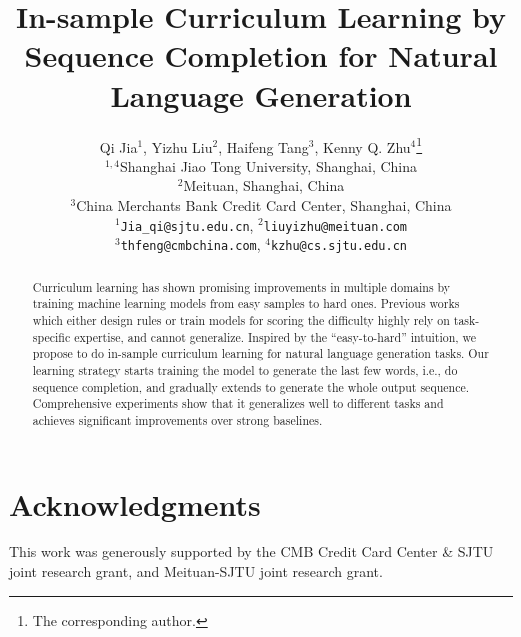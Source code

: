 \documentclass[11pt]{article}
\title{In-sample Curriculum Learning by Sequence Completion for Natural Language Generation}
\author{Qi Jia$^1$, Yizhu Liu$^2$, Haifeng Tang$^3$, Kenny Q. Zhu$^4$\thanks{\hspace{2mm}The corresponding author.}\\
	$^{1,4}$Shanghai Jiao Tong University, Shanghai, China \\
	$^2$Meituan, Shanghai, China \\
	$^3$China Merchants Bank Credit Card Center, Shanghai, China \\
	\texttt{$^1$Jia\_qi@sjtu.edu.cn},
	\texttt{$^2$liuyizhu@meituan.com} \\ 
	\texttt{$^3$thfeng@cmbchina.com},
	\texttt{$^4$kzhu@cs.sjtu.edu.cn}\\
}
\begin{document}
\maketitle
\begin{abstract}
Curriculum learning has shown promising improvements in multiple domains by 
training machine learning models from easy samples to hard ones. 
Previous works which either design rules or train models for scoring the difficulty 
highly rely on task-specific expertise, and cannot generalize. Inspired by the ``easy-to-hard'' 
intuition, we propose to do in-sample curriculum learning for natural language generation tasks. 
Our learning strategy starts training the model to generate the last few words, i.e., 
do sequence completion, and gradually extends to generate the whole output sequence.
Comprehensive experiments show that it generalizes well to different
tasks and achieves significant improvements over strong baselines.
\end{abstract}








\section*{Acknowledgments}
This work was generously supported by the CMB Credit Card Center \& SJTU
joint research grant, and Meituan-SJTU joint research grant.





 


\end{document}
